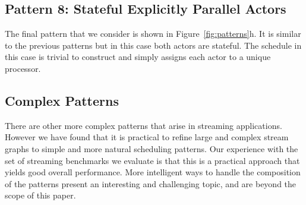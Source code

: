 \subsection{Pattern 8: Stateful Explicitly Parallel Actors}

The final pattern that we consider is shown in
Figure~\ref{fig:patterns}h. It is similar to the previous patterns but
in this case both actors are stateful. The schedule in this case is
trivial to construct and simply assigns each actor to a unique
processor.

\subsection{Complex Patterns}


There are other more complex patterns that arise in streaming
applications. However we have found that it is practical to refine
large and complex stream graphs to simple and more natural scheduling
patterns. Our experience with the set of streaming benchmarks we
evaluate is that this is a practical approach that yields good overall
performance. More intelligent ways to handle the composition of the
patterns present an interesting and challenging topic, and are beyond
the scope of this paper.


